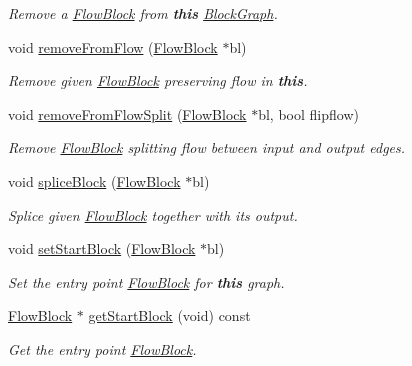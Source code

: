 \begin{DoxyCompactItemize}
\begin{DoxyCompactList}\small\item\em Remove a \mbox{\hyperlink{class_flow_block}{Flow\+Block}} from {\bfseries{this}} \mbox{\hyperlink{class_block_graph}{Block\+Graph}}. \end{DoxyCompactList}\item 
void \mbox{\hyperlink{class_block_graph_ae61430ab00f3437f85016b0c76907e94}{remove\+From\+Flow}} (\mbox{\hyperlink{class_flow_block}{Flow\+Block}} $\ast$bl)
\begin{DoxyCompactList}\small\item\em Remove given \mbox{\hyperlink{class_flow_block}{Flow\+Block}} preserving flow in {\bfseries{this}}. \end{DoxyCompactList}\item 
void \mbox{\hyperlink{class_block_graph_a8c6e3329fe131f587a472413dfd60fcd}{remove\+From\+Flow\+Split}} (\mbox{\hyperlink{class_flow_block}{Flow\+Block}} $\ast$bl, bool flipflow)
\begin{DoxyCompactList}\small\item\em Remove \mbox{\hyperlink{class_flow_block}{Flow\+Block}} splitting flow between input and output edges. \end{DoxyCompactList}\item 
void \mbox{\hyperlink{class_block_graph_a4f6da43f90aeadf0b19ddbcd95544fd3}{splice\+Block}} (\mbox{\hyperlink{class_flow_block}{Flow\+Block}} $\ast$bl)
\begin{DoxyCompactList}\small\item\em Splice given \mbox{\hyperlink{class_flow_block}{Flow\+Block}} together with its output. \end{DoxyCompactList}\item 
void \mbox{\hyperlink{class_block_graph_a8bc1763c69f71a1c6a088340ae4a256f}{set\+Start\+Block}} (\mbox{\hyperlink{class_flow_block}{Flow\+Block}} $\ast$bl)
\begin{DoxyCompactList}\small\item\em Set the entry point \mbox{\hyperlink{class_flow_block}{Flow\+Block}} for {\bfseries{this}} graph. \end{DoxyCompactList}\item 
\mbox{\hyperlink{class_flow_block}{Flow\+Block}} $\ast$ \mbox{\hyperlink{class_block_graph_ae4f8f8599ed5e3eb803536f1c9595f09}{get\+Start\+Block}} (void) const
\begin{DoxyCompactList}\small\item\em Get the entry point \mbox{\hyperlink{class_flow_block}{Flow\+Block}}. \end{DoxyCompactList}\item 

\end{DoxyCompactItemize}
